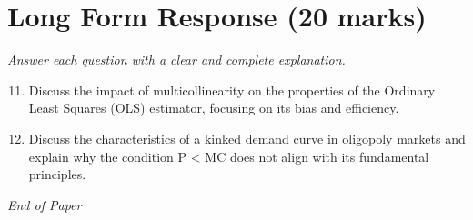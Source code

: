 \documentclass[12pt]{article}
\begin{document}
\section*{Long Form Response (20 marks)}
\textit{Answer each question with a clear and complete explanation.}
\begin{enumerate}[label=\arabic*.]
\setcounter{enumi}{10}
\item Discuss the impact of multicollinearity on the properties of the Ordinary Least Squares (OLS) estimator, focusing on its bias and efficiency.
\item Discuss the characteristics of a kinked demand curve in oligopoly markets and explain why the condition P \textless{} MC does not align with its fundamental principles.
\end{enumerate}

\vfill
\noindent\textit{End of Paper}
\end{document}
